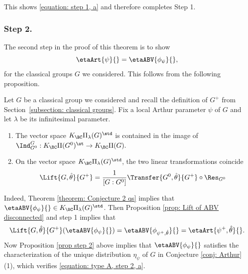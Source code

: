 \documentclass[11pt,letterpaper]{amsart}
\numberwithin{equation}{section}
\begin{document}
This shows \eqref{equation: step 1, a} and therefore 
completes Step 1.

\subsubsection{\bf Step 2.}\label{sec step 2}
    The second step in the proof of this theorem is to show 
\begin{equation}\label{equation: type A, step 2, a}
\etaArt{\psi}{} = \etaABV{\phi_{\psi}}{},
\end{equation}
for the classical groups $G$ we considered. This follows from the following proposition.
\begin{proposition}\label{prop step 2}
Let $G$ be a classical group we considered and recall the definition of $G^+$ from Section~\ref{subsection: classical groups}. Fix a local Arthur parameter $\psi$ of $G$ and let $\lambda$ be its infinitesimal parameter.
\begin{enumerate}
    \item  The vector space $K_{\BC}\Pi_{\lambda}(G)^{\std}$ is contained in the image of $\Ind_{G^0}^G: K_{\BC}\Pi(G^0)^{\st} \to K_{\BC}\Pi(G).$
    \item On the vector space $K_{\BC}\Pi_{\lambda}(G)^{\std}$, the two linear transformations coincide
    \[ \Lift{G,\hat{\theta}}{G^+}= \frac{1}{[G:G^0]}\Transfer{G^0,\hat{\theta}}{G^+} \circ \Res_{G^0}\]
\end{enumerate}
\end{proposition}

Indeed, Theorem \ref{theorem: Conjecture 2 qs} implies that $\etaABV{\phi_{\psi}}{} \in K_{\BC}\Pi_{\lambda}(G)^{\std}$. Then Proposition \ref{prop: Lift of ABV disconnected} and step 1 implies that
\[ \Lift{G,\hat{\theta}}{G^+}(\etaABV{\phi_{\psi}}{}) = \etaABV{\phi_{\psi^+,\hat{\theta}}}{}= \etaArt{\psi^+,\hat{\theta}}{}. \]
Now Proposition \ref{prop step 2} above implies that $\etaABV{\phi_{\psi}}{}$ satisfies the characterization of the unique distribution $\eta_{\psi}$ of $G$ in Conjecture \ref{conj: Arthur}(1), which verifies \eqref{equation: type A, step 2, a}.
\end{document}
